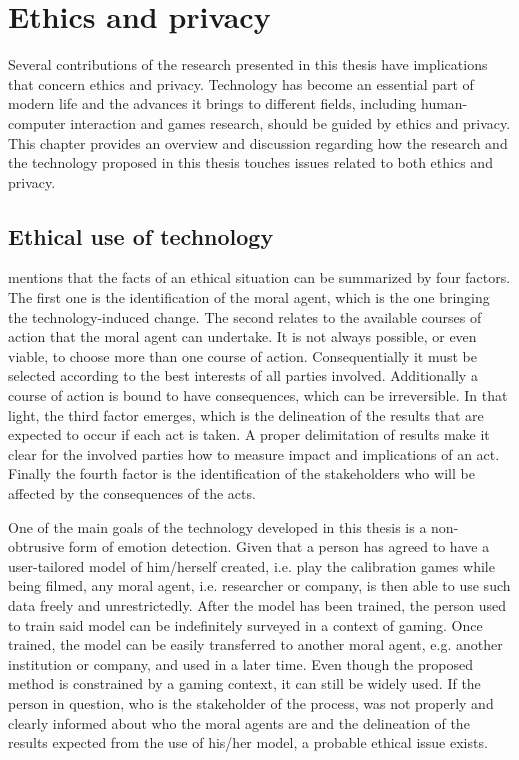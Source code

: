 \chapter{Ethics and privacy}
\label{ch:ethics}

Several contributions of the research presented in this thesis have implications that concern ethics and privacy. Technology has become an essential part of modern life and the advances it brings to different fields, including human-computer interaction and games research, should be guided by ethics and privacy. This chapter provides an overview and discussion regarding how the research and the technology proposed in this thesis touches issues related to both ethics and privacy.

\section{Ethical use of technology}
\label{s:ethics-ethical}

\textcite{mason1995applying} mentions that the facts of an ethical situation can be summarized by four factors. The first one is the identification of the moral agent, which is the one bringing the technology-induced change. The second relates to the available courses of action that the moral agent can undertake. It is not always possible, or even viable, to choose more than one course of action. Consequentially it must be selected according to the best interests of all parties involved. Additionally a course of action is bound to have consequences, which can be irreversible. In that light, the third factor emerges, which is the delineation of the results that are expected to occur if each act is taken. A proper delimitation of results make it clear for the involved parties how to measure impact and implications of an act. Finally the fourth factor is the identification of the stakeholders who will be affected by the consequences of the acts.

One of the main goals of the technology developed in this thesis is a non-obtrusive form of emotion detection. Given that a person has agreed to have a user-tailored model of him/herself created, i.e. play the calibration games while being filmed, any moral agent, i.e. researcher or company, is then able to use such data freely and unrestrictedly. After the model has been trained, the person used to train said model can be indefinitely surveyed in a context of gaming. Once trained, the model can be easily transferred to another moral agent, e.g. another institution or company, and used in a later time. Even though the proposed method is constrained by a gaming context, it can still be widely used. If the person in question, who is the stakeholder of the process, was not properly and clearly informed about who the moral agents are and the delineation of the results expected from the use of his/her model, a probable ethical issue exists.

